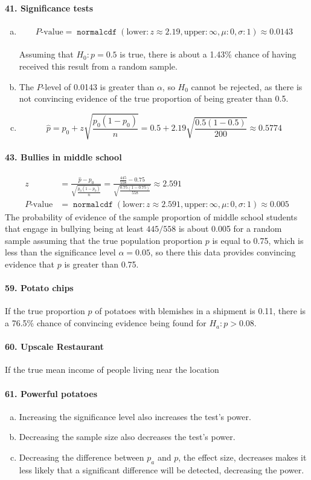 \documentclass[12pt, A4]{article}
\DeclareMathOperator{\normalcdf}{\texttt{normalcdf}}
\newcommand{\normalCDF}[4]{\normalcdf\left(\mathrm{lower}: #1, \mathrm{upper}: #2, \mu: #3, \sigma: #4\right)}
\newcommand{\propse}[2]{\sqrt{\frac{#1\left(1 - #1\right)}{#2}}}
\newcommand{\z}[3]{\frac{#1 - #2}{#3}}
\begin{document}
			\paragraph{41. Significance tests}
				\begin{enumerate}[a.]
					\item
						$$P\text{-value} = \normalCDF{z \approx 2.19}{\infty}{0}{1} \approx 0.0143$$ \\
						Assuming that $H_0:p = 0.5$ is true, there is about a 1.43\% chance of having received this result from a random sample.
					\item
						The $P$-level of 0.0143 is greater than $\alpha$, so $H_0$ cannot be rejected, as there is not convincing evidence of the true proportion of being greater than 0.5.
					\item
						$$\hat{p} = p_0 + z\propse{p_0}{n} = 0.5 + 2.19\propse{0.5}{200} \approx 0.5774$$
				\end{enumerate}
			\paragraph{43. Bullies in middle school}
				\begin{align*}
					z &= \z{\hat{p}}{p_0}{\propse{p_0}{n}} = \z{\frac{445}{558}}{0.75}{\propse{0.75}{558}} \approx 2.591 \\ 
					P\text{-value} &= \normalCDF{z \approx 2.591}{\infty}{0}{1} \approx 0.005
				\end{align*}
				The probability of evidence of the sample proportion of middle school students that engage in bullying being at least $445/558$ is about 0.005 for a random sample assuming that the true population proportion $p$ is equal to 0.75, which is less than the significance level $\alpha = 0.05$, so there this data provides convincing evidence that $p$ is greater than 0.75.
			\paragraph{59. Potato chips}
				If the true proportion $p$ of potatoes with blemishes in a shipment is 0.11, there is a 76.5\% chance of convincing evidence being found for $H_a: p > 0.08$.
			\paragraph{60. Upscale Restaurant}
				If the true mean income of people living near the location 
			\paragraph{61. Powerful potatoes}
				\begin{enumerate}[a.]
					\item
						Increasing the significance level also increases the test's power.
					\item
						Decreasing the sample size also decreases the test's power.
					\item
						Decreasing the difference between $p_a$ and $p$, the effect size, decreases makes it less likely that a significant difference will be detected, decreasing the power.
				\end{enumerate}
\end{document}
